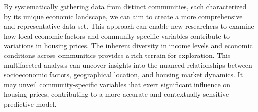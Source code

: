 \documentclass[12pt]{article}
\begin{document}
By systematically gathering data from distinct communities, each characterized by its unique economic landscape, we can aim to create a more comprehensive and representative data set. This approach can enable new researchers to examine how local economic factors and community-specific variables contribute to variations in housing prices. The inherent diversity in income levels and economic conditions across communities provides a rich terrain for exploration. This multifaceted analysis can uncover insights into the nuanced relationships between socioeconomic factors, geographical location, and housing market dynamics. It may unveil community-specific variables that exert significant influence on housing prices, contributing to a more accurate and contextually sensitive predictive model.




\medskip

\printbibliography[title={References}]
\end{document}
